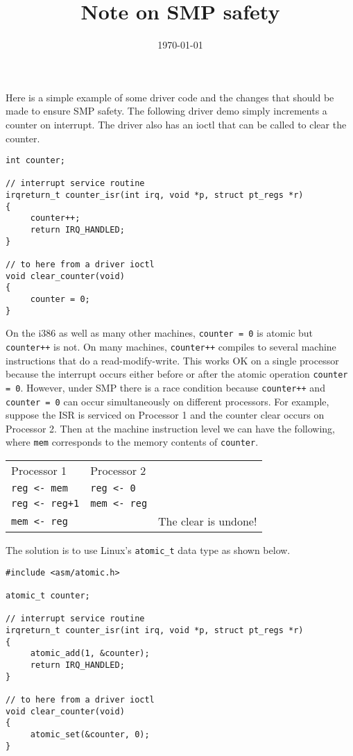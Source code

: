 \documentclass{article}
\title{Note on SMP safety}
\date{\today}
\begin{document}
\maketitle

\noindent
Here is a simple example of some driver code and the changes that should be made
to ensure SMP safety.
The following driver demo simply increments a counter on interrupt.
The driver also has an ioctl that can be called to clear the counter.

\begin{verbatim}
int counter;

// interrupt service routine
irqreturn_t counter_isr(int irq, void *p, struct pt_regs *r)
{
     counter++;
     return IRQ_HANDLED;
}

// to here from a driver ioctl
void clear_counter(void)
{
     counter = 0;
}
\end{verbatim}

\noindent
On the i386 as well as many other machines, \verb$counter = 0$ is atomic but
\verb$counter++$ is not.
On many machines, \verb$counter++$ compiles to several machine instructions that do
a read-modify-write.
This works OK on a single processor because the interrupt
occurs either before or after the atomic operation \verb$counter = 0$.
However, under SMP there is a race condition because
\verb$counter++$ and \verb$counter = 0$ can occur simultaneously on different
processors.
For example, suppose the ISR is serviced on Processor 1 and the counter clear
occurs on Processor 2. Then at the machine instruction level we can have the
following, where \verb$mem$ corresponds to the memory contents of
\verb$counter$.

\bigskip
\begin{tabular}{lll}
Processor 1 & Processor 2 \\
\verb$reg <- mem$ & \verb$reg <- 0$ \\
\verb$reg <- reg+1$ & \verb$mem <- reg$ \\
\verb$mem <- reg$ & & The clear is undone! \\
\end{tabular}

\newpage

\noindent
The solution is to use Linux's \verb$atomic_t$ data type as shown below.

\begin{verbatim}
#include <asm/atomic.h>

atomic_t counter;

// interrupt service routine
irqreturn_t counter_isr(int irq, void *p, struct pt_regs *r)
{
     atomic_add(1, &counter);
     return IRQ_HANDLED;
}

// to here from a driver ioctl
void clear_counter(void)
{
     atomic_set(&counter, 0);
}
\end{verbatim}
\end{document}
